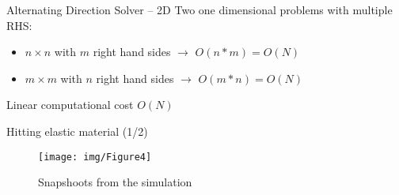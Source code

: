 \documentclass[c]{beamer}
\newcommand{\inblue}[1]{\textcolor{blue}{#1}}
\newcommand{\Mat}[1]{\mathbf{#1}}
\begin{document}
\begin{frame}[fragile]{Alternating Direction Solver -- 2D}
Two one dimensional problems with multiple RHS:
\begin{itemize}
\item $ n \times n $ with $m$ right hand sides $\rightarrow$ $O(n*m)=O(N)$
\item $ m \times m $ with $n$ right hand sides $\rightarrow$ $O(m*n)=O(N)$
\end{itemize}
Linear computational cost $O(N)$

\end{frame}



%
%
%
%
%


\begin{frame}{Hitting elastic material (1/2)}

    \begin{figure}
      \texttt{[image: img/Figure4]}
      \caption{Snapshoots from the simulation }
    \end{figure}


\end{frame}
\end{document}
